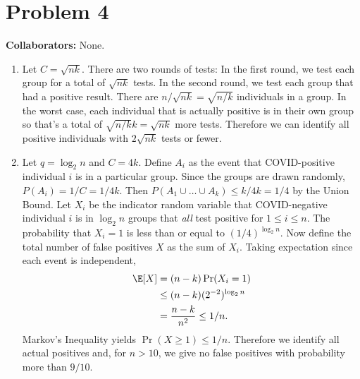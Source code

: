 \newpage
\section*{Problem 4}
\textbf{Collaborators:}  None.
\medskip

\begin{enumerate}
    \item Let $C=\sqrt{nk}$.
    There are two rounds of tests: In the first round,
    we test each group for a total of $\sqrt{nk}$ tests.
    In the second round, we test each group that had a
    positive result. There are $n/\sqrt{nk} = \sqrt{n/k}$
    individuals in a group. In the worst case, each
    individual that is actually positive is in their own group
    so that's a total of $\sqrt{n/k}k = \sqrt{nk}$ more tests.
    Therefore we can identify all positive individuals
    with $2\sqrt{nk}$ tests or fewer.
    \qedsymbol
    
    \item Let $q=\log_2 n$ and $C=4k$.
    Define $A_i$ as the event that COVID-positive
    individual $i$ is in a particular group.
    Since the groups are drawn randomly,
    $P(A_i) = 1/C = 1/4k$.
    Then $P(A_1 \cup \dots \cup A_k) \leq k/4k =1/4$
    by the Union Bound.
    Let $X_i$ be the indicator random variable that COVID-negative
    individual $i$ is in $\log_2 n$ groups that \textit{all}
    test positive for $1 \leq i \leq n$.
    The probability that $X_i=1$ is less than or equal to
    $(1/4)^{\log_2 n}$.
    Now define the total number of false positives
    $X$ as the sum of $X_i$.
    Taking expectation since each event is independent,
    \begin{align}
        \E[X] &= (n-k) \Pr(X_i = 1) \nonumber \\
        &\leq (n-k) (2^{-2})^{\log_2 n} \nonumber \\
        &= \frac{n-k}{n^2} \leq 1/n.
        \nonumber
    \end{align}
    Markov's Inequality yields
    $\Pr(X\geq1) \leq 1/n$.
    Therefore we identify all actual positives and, 
    for $n>10$, we give no false positives with probability
    more than $9/10$.
    \qedsymbol
\end{enumerate}

